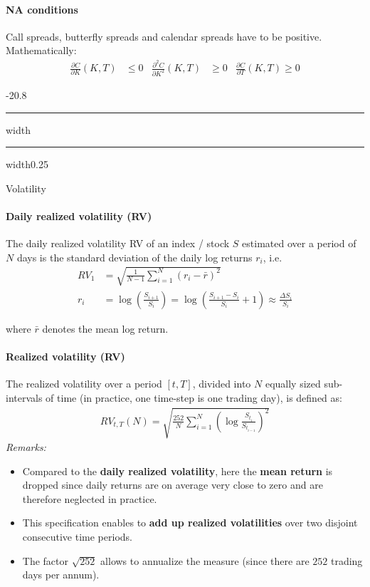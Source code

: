\documentclass[a4paper,landscape,7pt,fleqn]{scrartcl}
\makeatletter
\renewcommand{\emph}[1]{\textbf{#1}}
\renewcommand{\section}{\@startsection{section}{1}{0mm}%
{-2\baselineskip}{0.8\baselineskip}%
{\hrule depth 0.2pt width\columnwidth\hrule depth1.5pt
width0.25\columnwidth\vspace*{1.2em}\Large\bfseries}}
\makeatother
\begin{document}
\begin{multicols*}{3}
\paragraph{NA conditions}
Call spreads, butterfly spreads and calendar spreads have to be positive. Mathematically:
\begin{align*}
\frac{\partial C}{\partial K}(K,T) &\leq 0 & \frac{\partial^2 C}{\partial K^2}(K,T) &\geq 0 & \frac{\partial C}{\partial T}(K,T) \geq 0
\end{align*}

\columnbreak

\section{Volatility}

\paragraph{Daily realized volatility (RV)}
The daily realized volatility RV of an index / stock $S$ estimated over a period of $N$ days is the standard deviation of the daily log returns $r_i$, i.e.
\begin{align*}
RV_1 &= \sqrt{\frac{1}{N-1} \sum_{i=1}^N (r_i - \bar r)^2} \\
r_i &= \log \left( \frac{S_{i+1}}{S_i} \right) = \log \left( \frac{S_{i+1} - S_i}{S_i} + 1 \right) \approx \frac{\Delta S_i}{S_i}
\end{align*}

where $\bar r$ denotes the mean log return.

\paragraph{Realized volatility (RV)}
The realized volatility over a period $[t,T]$, divided into $N$ equally sized sub-intervals of time (in practice, one time-step is one trading day), is defined as:
\begin{align*}
RV_{t,T}(N) = \sqrt{\frac{252}{N} \sum_{i=1}^N \left( \log \frac{S_{t_i}}{S_{t_{i-1}}} \right)^2}
\end{align*}
\textit{Remarks:}
\begin{itemize}
\item Compared to the \emph{daily realized volatility}, here the \emph{mean return} is dropped since daily returns are on average very close to zero and are therefore neglected in practice.
\item This specification enables to \emph{add up realized volatilities} over two disjoint consecutive time periods.
\item The factor $\sqrt{252}$ allows to annualize the measure (since there are $252$ trading days per annum).
\end{itemize}


\end{multicols*}
\end{document}
